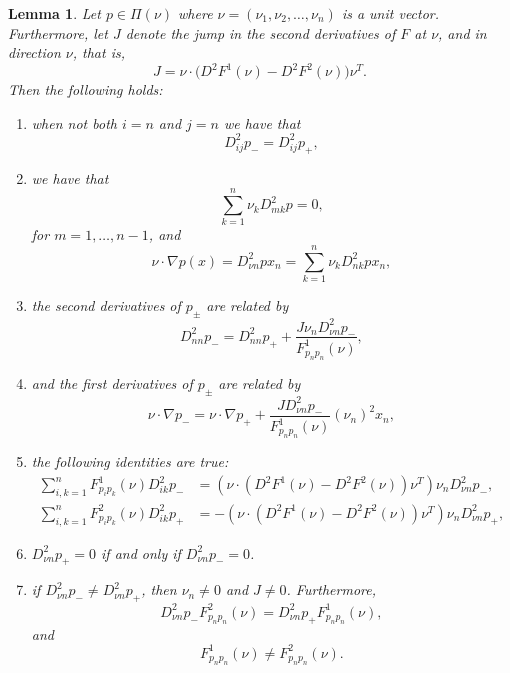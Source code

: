 \documentclass[10pt,a4paper]{amsart}
\newtheorem{lem}{Lemma}
\begin{document}
\begin{lem}\label{lem:structure_p}
Let $p \in \Pi(\nu)$ where $\nu = (\nu_1,\nu_2, \hdots, \nu_n)$ is a unit vector. Furthermore, let $J$ denote the jump in the second derivatives of $F$ at $\nu$, and in direction $\nu$, that is,
\begin{equation*}\label{eq:DefJump}
J=\nu\cdot\big(D^2 F^1(\nu)-D^2 F^2(\nu)\big) \nu^T.
\end{equation*}
Then the following holds:
\begin{enumerate}
 \item when not both $i=n$ and $j=n$ we have that
 $$
D^2_{ij} p_- = D^2_{ij} p_+,
 $$
 \item we have that
 \begin{equation*}
     \sum_{k=1}^{n} \nu_k D^2_{mk} p = 0,
 \end{equation*}
  for $m=1, \hdots, n-1$, and 
 \begin{equation*}
    \nu \cdot \nabla p(x) = D^2_{\nu n} p  x_n = \sum_{k=1}^n \nu_k D^2_{nk}p x_n,
\end{equation*}
 \item the second derivatives of $p_\pm$ are related by
\begin{equation}\label{eq:Dpn1}
  D^2_{nn} p_-=D^2_{nn} p_+
 +\frac{J \nu_n D^2_{\nu n}p_-}{F^1_{p_n p_n}(\nu)},   
\end{equation}
 \item and the first derivatives of $p_{\pm}$ are related by
 $$
 \nu\cdot \nabla p_-=\nu\cdot \nabla p_+ +\frac{JD^2_{\nu n}p_-}{F^1_{p_n p_n}(\nu)} (\nu_n)^2 x_n,
 $$
 \item the following identities are true:
    \begin{align}
        \sum_{i, k = 1}^n F^1_{p_i p_k}(\nu)D^2_{ik} p_- &= (\nu \cdot (D^2 F^1 (\nu)-D^2 F^2(\nu)) \nu^T) \nu_n D^2_{\nu n}p_-, \label{eq:sumpoly1} \\
         \sum_{i, k = 1}^n F^2_{p_i p_k}(\nu)D^2_{ik} p_+ & = -(\nu \cdot (D^2 F^1 (\nu)-D^2 F^2(\nu)) \nu^T) \nu_n D^2_{\nu n}p_+, \label{eq:sumpoly2}
    \end{align}
\item $D^2_{\nu n}p_{+}=0$ if and only if $D^2_{\nu n}p_{-}=0$.
 \item if $D^2_{\nu n}p_{-} \neq D^2_{\nu n}p_{+}$, then $\nu_n \neq 0$ and $J \neq 0$. Furthermore,
        \begin{equation*}
                D^2_{\nu n} p_- F^2 _{p_n p_n}(\nu) = D^2_{\nu n } p_+ F^1_{p_n p_n}(\nu),
        \end{equation*}
and
$$
F^1_{p_n p_n}(\nu) \neq F^2_{p_n p_n}(\nu).
$$
\end{enumerate}

\end{lem}
\end{document}
